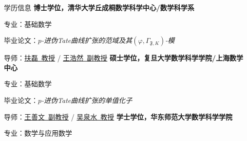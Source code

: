 \begin{rubric}{学历信息}
\entry*[2022--2025]%
	\textbf{博士学位，清华大学丘成桐数学科学中心/数学科学系}
	\par 专业：基础数学
	\par 毕业论文：\emph{$p$-进伪Tate曲线扩张的范域及其$(\varphi,\Gamma_{\mathfrak{F},K})$-模}
	\par 导师：\href{https://ymsc.tsinghua.edu.cn/en/info/1031/1888.htm}{扶磊\ 教授} / \href{https://ams.cnu.edu.cn/rydw/jyry/9e6cb5ce09ab4353a01ddb5ef0a1fabd.htm}{王浩然\ 副教授}
%
\entry*[2018 -- 2021]%
	\textbf{硕士学位，复旦大学数学科学学院/上海数学中心}
	\par 专业：基础数学
	\par 毕业论文：\emph{$p$-进伪Tate曲线扩张的单值化子}
	\par 导师：\href{https://shanwenwang.github.io/index.html}{王善文\ 副教授} / \href{https://scms.fudan.edu.cn/info/2459/2712.htm}{吴泉水\ 教授}
% 
\entry*[2014 -- 2018]%
	\textbf{学士学位，华东师范大学数学科学学院}
	\par 专业：数学与应用数学
\end{rubric}